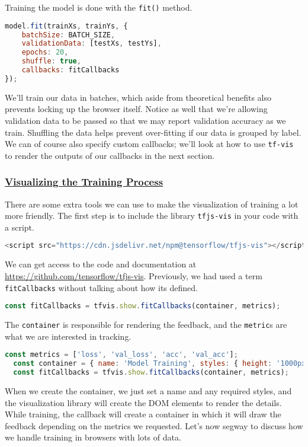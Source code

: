\documentclass[12pt]{article}
\begin{document}
Training the model is done with the \texttt{fit()} method.
\begin{lstlisting}[language=JavaScript]
  model.fit(trainXs, trainYs, {
    batchSize: BATCH_SIZE,
    validationData: [testXs, testYs],
    epochs: 20,
    shuffle: true,
    callbacks: fitCallbacks
});
\end{lstlisting}
We'll train our data in batches, which aside from theoretical benefits also prevents locking up the browser itself. Notice as well that we're allowing validation data to be passed so that we may report validation accuracy as we train. Shuffling the data helps prevent over-fitting if our data is grouped
by label. We can of course also specify custom callbacks; we'll look at how to use \texttt{tf-vis} to render the outputs of our callbacks in the next section.

\subsubsection{\href{https://github.com/tensorflow/tfjs/tree/master/tfjs-vis}{Visualizing the Training Process}}
There are some extra tools we can use to make the visualization of training a lot more friendly. The first step is to include the library \texttt{tfjs-vis} in your code with a script.
\begin{lstlisting}[language=JavaScript]
  <script src="https://cdn.jsdelivr.net/npm@tensorflow/tfjs-vis"></script>
\end{lstlisting}
We can get access to the code and documentation at \url{https://github.com/tensorflow/tfjs-vis}.
Previously, we had used a term \texttt{fitCallbacks} without talking about how its defined.
\begin{lstlisting}[language=JavaScript]
  const fitCallbacks = tfvis.show.fitCallbacks(container, metrics);
\end{lstlisting}
The \texttt{container} is responsible for rendering the feedback, and the \texttt{metric}s are what we are interested in tracking.
\begin{lstlisting}[language=JavaScript]
  const metrics = ['loss', 'val_loss', 'acc', 'val_acc'];
  const container = { name: 'Model Training', styles: { height: '1000px' } };
  const fitCallbacks = tfvis.show.fitCallbacks(container, metrics);
\end{lstlisting}
When we create the container, we just set a name and any required styles, and the visualization library will create the DOM elements to render the details. While training, the callback will create a container in which it will draw the feedback depending on the metrics we requested. Let's now segway to discuss how we handle training in browsers with lots of data.
\end{document}
